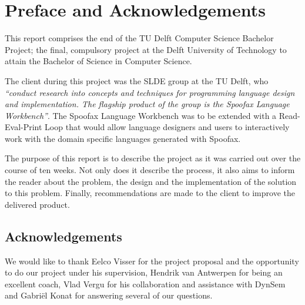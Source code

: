 \chapter{Preface and Acknowledgements}
\label{cha:preface-acks}

This report comprises the end of the TU Delft Computer Science Bachelor Project;
the final, compulsory project at the Delft University of Technology to attain
the Bachelor of Science in Computer Science.

The client during this project was the SLDE group at the TU Delft, who
\textit{``conduct research into concepts and techniques for programming language
design and implementation. The flagship product of the group is the Spoofax
Language Workbench''}. The Spoofax Language Workbench was to be extended with a
Read-Eval-Print Loop that would allow language designers and users to
interactively work with the domain specific languages generated with Spoofax.

The purpose of this report is to describe the project as it was carried out over
the course of ten weeks. Not only does it describe the process, it also aims to
inform the reader about the problem, the design and the implementation of the
solution to this problem. Finally, recommendations are made to the client to
improve the delivered product.

\section*{Acknowledgements}

We would like to thank Eelco Visser for the project proposal and the
opportunity to do our project under his supervision, Hendrik van Antwerpen for
being an excellent coach, Vlad Vergu for his collaboration and assistance with
DynSem and Gabri\"el Konat for answering several of our questions.

